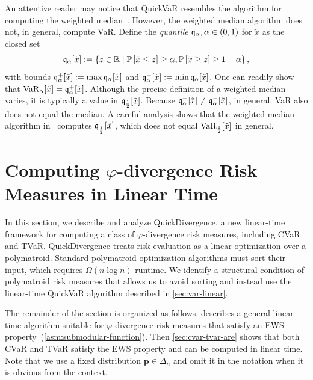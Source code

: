 \begin{remark} \label{rem:weighted-median}
  An attentive reader may notice that QuickVaR resembles the algorithm for computing the weighted median~\cite[section~17.1]{Korte2012}. However, the weighted median algorithm does not, in general, compute VaR. Define the \emph{quantile} ${\mathfrak{q}}_{\alpha},\alpha \in (0,1)$ for $\tilde{x}$ as the closed set
\[
 {\mathfrak{q}}_{\alpha}[\tilde{x}] := \left\{ z\in \mathbb{R} \mid  \mathbb{P}\left[  \tilde{x} \le z  \right] \ge \alpha, \mathbb{P}\left[  \tilde{x} \ge z  \right] \ge 1-\alpha  \right\},
\]
with bounds ${\mathfrak{q}}^+_{\alpha}[\tilde{x}] := \max {\mathfrak{q}}_{\alpha}[\tilde{x}]$ and ${\mathfrak{q}}^-_{\alpha}[\tilde{x}] := \min {\mathfrak{q}}_{\alpha}[\tilde{x}]$. One can readily show that $\operatorname{VaR}_{\alpha }[\tilde{x}] = {\mathfrak{q}}^+_{\alpha}[\tilde{x}]$. Although the precise definition of a weighted median varies, it is typically a value in ${\mathfrak{q}}_{\frac{1}{2}}[\tilde{x}]$. Because ${\mathfrak{q}}^+_{\alpha}[\tilde{x}] \neq {\mathfrak{q}}^{-}_{\alpha}[\tilde{x}]$, in general, VaR also does not equal the median. A careful analysis shows that the weighted median algorithm in~\citet[section~17]{Korte2012} computes ${\mathfrak{q}}^-_{\frac{1}{2}}[\tilde{x}]$, which does not equal $\operatorname{VaR}_{\frac{1}{2}}[\tilde{x}]$ in general.
\end{remark}

\section{Computing \texorpdfstring{$\varphi$}{phi}-divergence Risk Measures in Linear Time} \label{sec:phi-divergence}

In this section, we describe and analyze QuickDivergence, a new linear-time framework for computing a class of $\varphi$-divergence risk measures, including CVaR and TVaR. QuickDivergence treats risk evaluation as a linear optimization over a polymatroid. Standard polymatroid optimization algorithms must sort their input, which requires $\Omega(n \log  n)$ runtime. We identify a structural condition of polymatroid risk measures that allows us to avoid sorting and instead use the linear-time QuickVaR algorithm described in \cref{sec:var-linear}.

The remainder of the section is organized as follows.  describes a general linear-time algorithm suitable for $\varphi$-divergence risk measures that satisfy an EWS property~(\cref{asm:submodular-function}). Then \cref{sec:cvar-tvar-are} shows that both CVaR and TVaR satisfy the EWS property and can be computed in linear time. Note that we use a fixed distribution $\bm{p} \in \Delta_n$ and omit it in the notation when it is obvious from the context.

